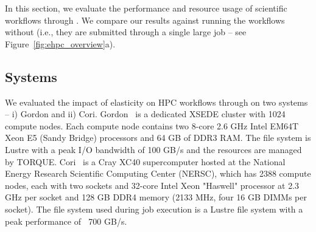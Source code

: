 
\newcommand{\montageFirst}{\textit{1-Parallel}\xspace}
\newcommand{\montageSecond}{\textit{2-Sequence}\xspace}
\newcommand{\montageThird}{\textit{3-Parallel}\xspace}
\newcommand{\montageFourth}{\textit{4-Sequence}\xspace}

\newcommand{\blastFirst}{\textit{1-Parallel}\xspace}
\newcommand{\blastSecond}{\textit{2-Sequence}\xspace}

\newcommand{\synFirst}{\textit{1-Sequence}\xspace}
\newcommand{\synSecond}{\textit{2-Parallel}\xspace}

In this section, we evaluate the performance and resource usage of
scientific workflows through \systemname. We compare our results
against running the workflows without \systemname (i.e., they are
submitted through a single large job -- see Figure~\ref{fig:ehpc_overview}a). 

\vspace{-0.3cm}
\subsection{Systems} 
We evaluated the impact of elasticity on HPC workflows through
\systemname on two systems -- i) Gordon and ii) Cori.  Gordon~\cite{gordon} is a
dedicated XSEDE cluster with 1024 compute nodes.  Each compute node
contains two 8-core 2.6 GHz Intel EM64T Xeon E5 (Sandy Bridge)
processors and 64 GB of DDR3 RAM. The file system is Lustre with a peak
I/O bandwidth of 100 GB/s and the
resources are managed by TORQUE. Cori~\cite{cori} is a Cray XC40 supercomputer
hosted at the National Energy Research Scientific Computing Center
(NERSC), which has 2388 compute nodes, each with two sockets and
32-core Intel Xeon "Haswell" processor at 2.3 GHz per socket and 128
GB DDR4 memory (2133 MHz, four 16 GB DIMMs per socket). The file
system used during job execution is a Lustre file system with
a peak performance of $~$ 700 GB/s.

